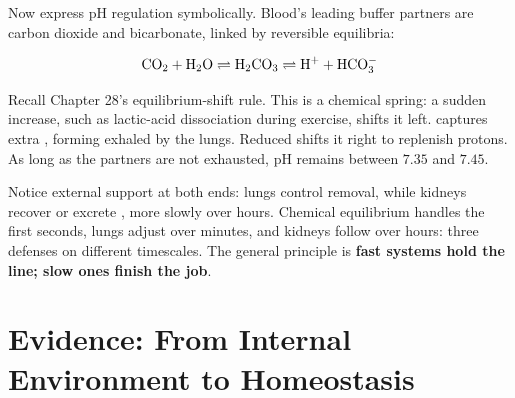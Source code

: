 Now express pH regulation symbolically. Blood's leading buffer partners are carbon dioxide and bicarbonate, linked by reversible equilibria:

\[\mathrm{CO_2} + \mathrm{H_2O} \rightleftharpoons \mathrm{H_2CO_3} \rightleftharpoons \mathrm{H^{+}} + \mathrm{HCO_3^{-}}\]

Recall Chapter 28's equilibrium-shift rule. This is a chemical spring: a sudden  increase, such as lactic-acid dissociation during exercise, shifts it left.  captures extra , forming  exhaled by the lungs. Reduced  shifts it right to replenish protons. As long as the partners are not exhausted, pH remains between $7.35$ and $7.45$.

Notice external support at both ends: lungs control  removal, while kidneys recover or excrete , more slowly over hours. Chemical equilibrium handles the first seconds, lungs adjust over minutes, and kidneys follow over hours: three defenses on different timescales. The general principle is \textbf{fast systems hold the line; slow ones finish the job}.

\section{Evidence: From Internal Environment to Homeostasis}

